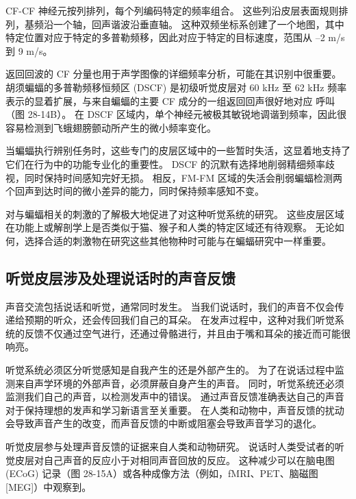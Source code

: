 CF-CF 神经元按列排列，每个列编码特定的频率组合。 
这些列沿皮层表面规则排列，基频沿一个轴，回声谐波沿垂直轴。 
这种双频坐标系创建了一个地图，其中特定位置对应于特定的多普勒频移，因此对应于特定的目标速度，范围从 –2 m/s 到 9 m/s。


返回回波的 CF 分量也用于声学图像的详细频率分析，可能在其识别中很重要。 
胡须蝙蝠的多普勒频移恒频区 (DSCF) 是初级听觉皮层对 60 kHz 至 62 kHz 频率表示的显着扩展，与来自蝙蝠的主要 CF 成分的一组返回回声很好地对应 呼叫（图 28-14B）。 
在 DSCF 区域内，单个神经元被极其敏锐地调谐到频率，因此很容易检测到飞蛾翅膀颤动所产生的微小频率变化。


当蝙蝠执行辨别任务时，这些专门的皮层区域中的一些暂时失活，这显着地支持了它们在行为中的功能专业化的重要性。 
DSCF 的沉默有选择地削弱精细频率歧视，同时保持时间感知完好无损。 
相反，FM-FM 区域的失活会削弱蝙蝠检测两个回声到达时间的微小差异的能力，同时保持频率感知不变。


对与蝙蝠相关的刺激的了解极大地促进了对这种听觉系统的研究。 
这些皮层区域在功能上或解剖学上是否类似于猫、猴子和人类的特定区域还有待观察。 
无论如何，选择合适的刺激物在研究这些其他物种时可能与在蝙蝠研究中一样重要。


\subsection{听觉皮层涉及处理说话时的声音反馈}
声音交流包括说话和听觉，通常同时发生。 
当我们说话时，我们的声音不仅会传递给预期的听众，还会传回我们自己的耳朵。 
在发声过程中，这种对我们听觉系统的反馈不仅通过空气进行，还通过骨骼进行，并且由于嘴和耳朵的接近而可能很响亮。


听觉系统必须区分听觉感知是自我产生的还是外部产生的。 
为了在说话过程中监测来自声学环境的外部声音，必须屏蔽自身产生的声音。 
同时，听觉系统还必须监测我们自己的声音，以检测发声中的错误。 
通过声音反馈准确表达自己的声音对于保持理想的发声和学习新语言至关重要。 
在人类和动物中，声音反馈的扰动会导致声音产生的改变，而声音反馈的中断或阻塞会导致声音学习的退化。

听觉皮层参与处理声音反馈的证据来自人类和动物研究。 
说话时人类受试者的听觉皮层对自己声音的反应小于对相同声音回放的反应。 
这种减少可以在脑电图 (ECoG) 记录（图 28-15A）或各种成像方法（例如，fMRI、PET、脑磁图 [MEG]）中观察到。


